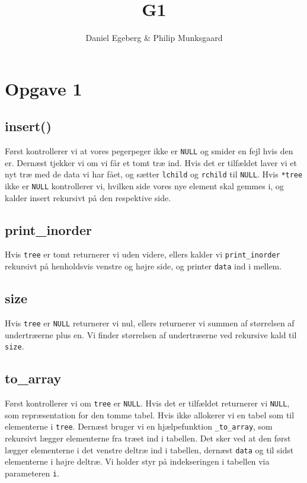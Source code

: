 \documentclass [10pt,a4paper]{article}
\title{G1}
\author{Daniel Egeberg \& Philip Munksgaard}
\begin{document}
\maketitle

\section*{Opgave 1}

\subsection*{insert()}

Først kontrollerer vi at vores pegerpeger ikke er \verb+NULL+ og smider en
fejl hvis den er. Dernæst tjekker vi om vi får et tomt træ ind. Hvis
det er tilfældet laver vi et nyt træ med de data vi har fået, og
sætter \verb+lchild+ og \verb+rchild+ til \verb+NULL+. 
Hvis \verb+*tree+ ikke er \verb+NULL+ kontrollerer vi, hvilken side vores nye
element skal gemmes i, og kalder insert rekursivt på den respektive
side.

\subsection*{print\_inorder}

Hvis \verb+tree+ er tomt returnerer vi uden videre, ellers kalder vi
\verb+print_inorder+ rekursivt på henholdsvis venstre og højre side, og
printer \verb+data+ ind i mellem.

\subsection*{size}

Hvis \verb+tree+ er \verb+NULL+ returnerer vi nul, ellers returnerer
vi summen af størrelsen af undertræerne plus en. Vi finder størrelsen
af undertræerne ved rekursive kald til \verb+size+.

\subsection*{to\_array}

Først kontrollerer vi om \verb+tree+ er \verb+NULL+. Hvis det er
tilfældet returnerer vi \verb+NULL+, som repræsentation for den tomme
tabel. Hvis ikke allokerer vi en tabel som til elementerne i
\verb+tree+. Dernæst bruger vi en hjælpefunktion \verb+_to_array+, som
rekursivt lægger elementerne fra træet ind i tabellen. Det sker ved at
den først lægger elementerne i det venstre deltræ ind i tabellen,
dernæst \verb+data+ og til sidst elementerne i højre deltræ. Vi holder
styr på indekseringen i tabellen via parameteren \verb+i+.
\end{document}
